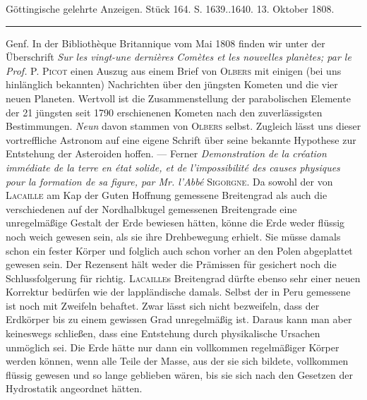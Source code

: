 \clearpage
{}
\hypertarget{native-512-lower}{}\label{native-512-lower}
\begin{center}\small Göttingische gelehrte Anzeigen. Stück 164. S. 1639..1640. 13. Oktober 1808.\\[3pt]\rule{.72\linewidth}{.3pt}\end{center}

Genf. In der Bibliothèque Britannique vom Mai 1808 finden wir unter der Überschrift \emph{Sur les vingt-une dernières Comètes et les nouvelles planètes; par le Prof.} \textsc{P. Picot} einen Auszug aus einem Brief von \textsc{Olbers} mit einigen (bei uns hinlänglich bekannten) Nachrichten über den jüngsten Kometen und die vier neuen Planeten. Wertvoll ist die Zusammenstellung der parabolischen Elemente der 21 jüngsten seit 1790 erschienenen Kometen nach den zuverlässigsten Bestimmungen. \emph{Neun} davon stammen von \textsc{Olbers} selbst. Zugleich lässt uns dieser vortreffliche Astronom auf eine eigene Schrift über seine bekannte Hypothese zur Entstehung der Asteroiden hoffen. --- Ferner \emph{Demonstration de la création immédiate de la terre en état solide, et de l'impossibilité des causes physiques pour la formation de sa figure, par Mr. l'Abbé} \textsc{Sigorgne}. Da sowohl der von \textsc{Lacaille} am Kap der Guten Hoffnung gemessene Breitengrad als auch die verschiedenen auf der Nordhalbkugel gemessenen Breitengrade eine unregelmäßige Gestalt der Erde bewiesen hätten, könne die Erde weder flüssig noch weich gewesen sein, als sie ihre Drehbewegung erhielt. Sie müsse damals schon ein fester Körper und folglich auch schon vorher an den Polen abgeplattet gewesen sein. Der Rezensent hält weder die Prämissen für gesichert noch die Schlussfolgerung für richtig. \textsc{Lacaille}s Breitengrad dürfte ebenso sehr einer neuen Korrektur bedürfen wie der lappländische damals. Selbst der in Peru gemessene ist noch mit Zweifeln behaftet. Zwar lässt sich nicht bezweifeln, dass der Erdkörper bis zu einem gewissen Grad unregelmäßig ist. Daraus kann man aber keineswegs schließen, dass eine Entstehung durch physikalische Ursachen unmöglich sei. Die Erde hätte nur dann ein vollkommen regelmäßiger Körper werden können, wenn alle Teile der Masse, aus der sie sich bildete, vollkommen flüssig gewesen und so lange geblieben wären, bis sie sich nach den Gesetzen der Hydrostatik angeordnet hätten.
